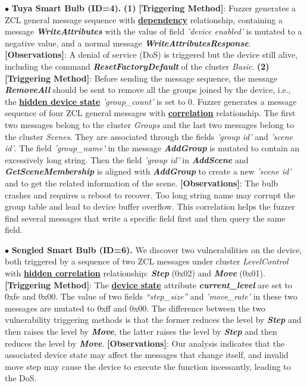 \documentclass[10pt,journal,compsoc]{IEEEtran}
\begin{document}
$\bullet$ \textbf{Tuya Smart Bulb (ID=4).} \textbf{(1)} \textbf{[Triggering Method]}: Fuzzer generates a ZCL general message sequence with \underline{\textbf{dependency}} relationship, containing a message \textbf{\textit{WriteAttributes}} with the value of field \textit{'device enabled'} is mutated to a negative value, and a normal message \textbf{\textit{WriteAttributesResponse}}. \textbf{[Observations]}: A denial of service (DoS) is triggered but the device still alive, including the command \textbf{\textit{ResetFactoryDefault}} of the cluster \textit{Basic}. \textbf{(2)} \textbf{[Triggering Method]}: Before sending the message sequence, the message \textbf{\textit{RemoveAll}} should be sent to remove all the groups joined by the device, i.e., the \underline{\textbf{hidden device state}} \textit{'group\_count'} is set to 0. 
Fuzzer generates a message sequence of four ZCL general messages with \underline{\textbf{correlation}} relationship. The first two messages belong to the cluster \textit{Groups} and the last two messages belong to the cluster \textit{Scenes}. They are associated through the fields \textit{'group id'} and \textit{'scene id'}. The field \textit{'group\_name'} in the message \textbf{\textit{AddGroup}} is mutated to contain an excessively long string. Then the field \textit{'group id'} in \textbf{\textit{AddScene}} and \textbf{\textit{GetSceneMembership}} is aligned with \textbf{\textit{AddGroup}} to create a new \textit{'scene id'} and to get the related information of the scene. \textbf{[Observations]}: The bulb crashes and requires a reboot to recover. Too long string name may corrupt the group table and lead to device buffer overflow. This correlation helps the fuzzer find several messages that write a specific field first and then query the same field.

$\bullet$ \textbf{Sengled Smart Bulb (ID=6).} We discover two vulnerabilities on the device, both triggered by a sequence of two ZCL messages under cluster \textit{LevelControl} with \underline{\textbf{hidden correlation}} relationship: \textbf{\textit{Step}} (0x02) and \textbf{\textit{Move}} (0x01). \textbf{[Triggering Method]}: The \underline{\textbf{device state}} attribute \textbf{\textit{current\_level}} are set to 0xfe and 0x00. The value of two fields \textit{“step\_size”} and \textit{'move\_rate'} in these two messages are mutated to 0xff and 0x00. The difference between the two vulnerability triggering methods is that the former reduces the level by \textbf{\textit{Step}} and then raises the level by \textbf{\textit{Move}}, the latter raises the level by \textbf{\textit{Step}} and then reduces the level by \textbf{\textit{Move}}. \textbf{[Observations]}: Our analysis indicates that the associated device state may affect the messages that change itself, and invalid move step may cause the device to execute the function incessantly, leading to the DoS. \vspace{0.1cm} 
\end{document}
